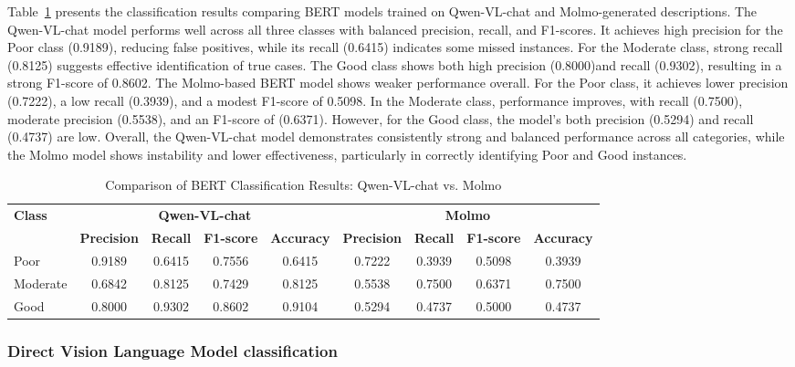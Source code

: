 \documentclass[11pt]{article}
\begin{document}
Table~\ref{tab:bert_table} presents the classification results comparing BERT models trained on Qwen-VL-chat and Molmo-generated descriptions. The Qwen-VL-chat model performs well across all three classes with balanced precision, recall, and F1-scores. It achieves high precision for the Poor class (0.9189), reducing false positives, while its recall (0.6415) indicates some missed instances. For the Moderate class, strong recall (0.8125) suggests effective identification of true cases. The Good class shows both high precision (0.8000)and recall ({0.9302}), resulting in a strong F1-score of {0.8602}. The Molmo-based BERT model shows weaker performance overall. For the Poor class, it achieves lower precision (0.7222), a low recall (0.3939), and a modest F1-score of 0.5098. In the Moderate class, performance improves, with recall (0.7500), moderate precision (0.5538), and an F1-score of (0.6371). However, for the Good class, the model's both precision (0.5294) and recall (0.4737) are low. Overall, the Qwen-VL-chat model demonstrates consistently strong and balanced performance across all categories, while the Molmo model shows instability and lower effectiveness, particularly in correctly identifying Poor and Good instances. 



\begin{table}[H]
\centering
\caption{Comparison of BERT Classification Results: Qwen-VL-chat vs. Molmo}
\label{tab:bert_table}
\begin{tabular}{l|cccc|cccc}
\hline
\multirow{2}{*}{\textbf{Class}} & \multicolumn{4}{c|}{\textbf{Qwen-VL-chat}} & \multicolumn{4}{c}{\textbf{Molmo}} \\
 & \textbf{Precision} & \textbf{Recall} & \textbf{F1-score} & \textbf{Accuracy} & \textbf{Precision} & \textbf{Recall} & \textbf{F1-score} & \textbf{Accuracy} \\
\hline
Poor     & 0.9189 & 0.6415 & 0.7556 & 0.6415 & 0.7222 & 0.3939 & 0.5098 & 0.3939 \\
Moderate & 0.6842 & 0.8125& 0.7429 & 0.8125 & 0.5538 & 0.7500 & 0.6371 & 0.7500 \\
Good     & 0.8000 & 0.9302 & 0.8602 & 0.9104 & 0.5294 & 0.4737 & 0.5000 & 0.4737 \\
\hline
\end{tabular}
\end{table}


\subsubsection{Direct Vision Language Model classification}
\end{document}
